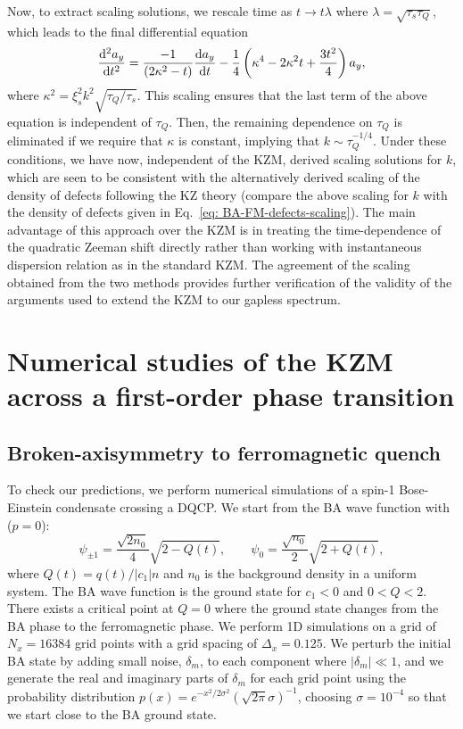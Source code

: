 Now, to extract scaling solutions, we rescale time as \(t\rightarrow t\lambda \)
where \(\lambda = \sqrt{\tau_s\tau_Q}\), which leads to the final differential
equation
\begin{align} \label{eq: eqn-scaled-lin}
    \dv[2]{a_y}{t} = \frac{-1}{\left( 2\kappa^2 - t\right)}\dv{a_y}{t}
    -\frac{1}{4} \left( \kappa^4 - 2\kappa^2 t + \frac{3 t^2}{4} \right)a_y,
\end{align}
where \(\kappa^2 = \xi_s^2 k^2 \sqrt{\tau_Q/\tau_s}\).
This scaling ensures that the last term of the above equation is independent of
\(\tau_Q\).
Then, the remaining dependence on \(\tau_Q\) is eliminated if we require that
\(\kappa \) is constant, implying that \(k \sim \tau_Q^{-1/4}\).
Under these conditions, we have now, independent of the KZM, derived scaling
solutions for \(k\), which are seen to be consistent with the alternatively
derived scaling of the density of defects following the KZ theory (compare the
above scaling for \(k\) with the density of defects given in
Eq.~\eqref{eq: BA-FM-defects-scaling}).
The main advantage of this approach over the KZM is in treating the
time-dependence of the quadratic Zeeman shift directly rather than working with
instantaneous dispersion relation as in the standard KZM\@.
The agreement of the scaling obtained from the two methods provides further
verification of the validity of the arguments used to extend the KZM to our
gapless spectrum.

\section{Numerical studies of the KZM across a first-order phase transition}
\subsection{Broken-axisymmetry to ferromagnetic quench}
To check our predictions, we perform numerical simulations of a spin-1
Bose-Einstein condensate crossing a DQCP\@.
We start from the BA wave function with (\( p=0 \)):
\begin{equation}
    \psi_{\pm 1} = \frac{\sqrt{2n_0}}{4}\sqrt{2 - Q(t)}, \qquad
    \psi_0 = \frac{\sqrt{n_0}}{2}\sqrt{2 + Q(t)},
    \label{eq: BA-initial-wavefunction}
\end{equation}
where \(Q(t)=q(t)/|c_1|n\) and \(n_0\) is the background density in a uniform
system.
The BA wave function is the ground state for \(c_1 < 0\) and \(0 < Q < 2\).
There exists a critical point at \( Q = 0 \) where the ground state changes from
the BA phase to the ferromagnetic phase.
We perform 1D simulations on a grid of \(N_x = 16384\) grid points with a grid
spacing of \(\Delta_x = 0.125\).
We perturb the initial BA state by adding small noise, \(\delta_m\), to each
component where \(|\delta_m| \ll 1\), and we generate the real and imaginary
parts of \(\delta_m\) for each grid point using the probability distribution
\(p(x) = e^{-x^2/2\sigma^2}{(\sqrt{2\pi}\sigma)}^{-1}\), choosing
\(\sigma=10^{-4}\) so that we start close to the BA ground state.

